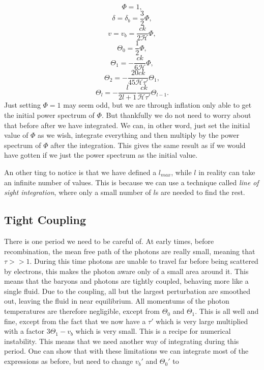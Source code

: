 \documentclass[a4paper,norsk, 10pt]{article}
\begin{document}
\begin{equation}
\Phi = 1,
\end{equation}
\begin{equation}
\delta = \delta_b = \frac{3}{2}\Phi,
\end{equation}
\begin{equation}
v = v_b = \frac{ck}{2\mathcal{H}}\Phi,
\end{equation}
\begin{equation}
\Theta_0 = \frac{1}{2}\Phi,
\end{equation}
\begin{equation}
\Theta_1 = -\frac{ck}{6\mathcal{H}}\Phi,
\end{equation}
\begin{equation}
\Theta_2 = -\frac{20ck}{45\mathcal{H}\tau'}\Theta_1,
\end{equation}
\begin{equation}
\Theta_l = -\frac{l}{2l+1}\frac{ck}{\mathcal{H}\tau'}\Theta_{l-1}.
\end{equation}
Just setting $\Phi = 1$ may seem odd, but we are through inflation only able to get the initial power spectrum of $\Phi$. But thankfully we do not need to worry about that before after we have integrated. We can, in other word, just set the initial value of $\Phi$ as we wish, integrate everything and then multiply by the power spectrum of $\Phi$ after the integration. This gives the same result as if we would have gotten if we just the power spectrum as the initial value.

An other ting to notice is that we have defined a $l_{max}$, while $l$ in reality can take an infinite number of values. This is because we can use a technique called \textit{line of sight integration}, where only a small number of $l$s are needed to find the rest.


\subsection{Tight Coupling}\label{sec:tight}
There is one period we need to be careful of. At early times, before recombination, the mean free path of the photons are really small, meaning that $\tau >> 1$. During this time photons are unable to travel far before being scattered by electrons, this makes the photon aware only of a small area around it. This means that the baryons and photons are tightly coupled, behaving more like a single fluid. Due to the coupling, all but the largest perturbation are smoothed out, leaving the fluid in near equilibrium. All momentums of the photon temperatures are therefore negligible, except from $\Theta_0$ and $\Theta_1$. This is all well and fine, except from the fact that we now have a $\tau'$ which is very large multiplied with a factor $3\Theta_1-v_b$ which is very small. This is a recipe for numerical instability. This means that we need another way of integrating during this period. One can show that with these limitations we can integrate most of the expressions as before, but need to change $v_b'$ and $\Theta_0'$ to
\end{document}
